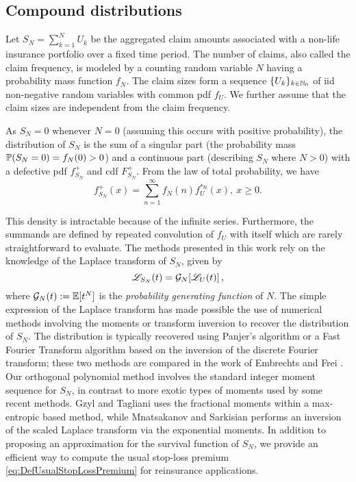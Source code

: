 \subsection{Compound distributions}

Let $S_N=\sum_{k=1}^{N}U_k$ be the aggregated claim amounts associated with a non-life insurance portfolio over a fixed time period. The number of claims, also called the claim frequency, is modeled by a counting random variable $N$ having a probability mass function $f_N$. The claim sizes form a sequence $\{U_k\}_{k\in \mathbb{N}_0}$ of iid non-negative random variables with common pdf $f_{U}$. We further assume that the claim sizes are independent from the claim frequency.

As $S_N=0$ whenever $N=0$ (assuming this occurs with positive probability), the distribution of $S_N$ is the sum of a singular part (the probability mass $\operatorname{{\mathbb P}}(S_N=0)=f_N(0)>0$) and a continuous part (describing $S_N$ where $N>0$) with a defective pdf $f_{S_N}^+$ and cdf $F_{S_N}^+$. From the law of total probability, we have
\begin{equation}\label{eq:DefectivePDFCompoundDistribution}
f_{S_N}^+(x)=\sum_{n=1}^{\infty}f_N(n)f_{U}^{\ast n}(x),~x\geq0.
\end{equation}

This density is intractable because of the infinite series. Furthermore, the summands are defined by repeated convolution of $f_{U}$ with itself which are rarely straightforward to evaluate. The methods presented in this work rely on the knowledge of the Laplace transform of $S_N$, given by
\begin{equation*}\label{eq:TransformsForCompoundDistribution}
\mathscr{L}_{S_N}(t) = \mathcal{G}_N[ \mathscr{L}_{U}(t) ] \,,
\end{equation*}
where $\mathcal{G}_N(t) := \operatorname{{\mathbb E}}[t^N]$ is the \emph{probability generating function} of $N$. The simple expression of the Laplace transform has made possible the use of numerical methods involving the moments or transform inversion to recover the distribution of $S_N$. The distribution is typically recovered using Panjer's algorithm or a Fast Fourier Transform algorithm based on the inversion of the discrete Fourier transform; these two methods are compared in the work of Embrechts and Frei \cite{embrechts2009panjer}. Our orthogonal polynomial method involves the standard integer moment sequence for $S_N$, in contrast to more exotic types of moments used by some recent methods. Gzyl and Tagliani \cite{GzTa12} uses the fractional moments within a max-entropic based method, while Mnatsakanov and Sarkisian \cite{Mnatsakanov2013} performs an inversion of the scaled Laplace transform via the exponential moments. In addition to proposing an approximation for the survival function of $S_N$, we provide an efficient way to compute the usual stop-loss premium \eqref{eq:DefUsualStopLossPremium} for reinsurance applications.

